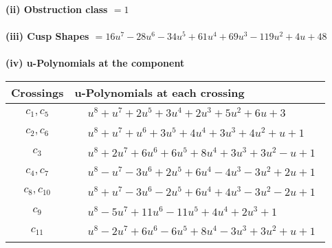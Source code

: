 \documentclass[1p]{elsarticle_modified}
\theoremstyle{definition}
\begin{document}
\flushleft \textbf{(ii) Obstruction class $= 1$}\\~\\
\flushleft \textbf{(iii) Cusp Shapes $= 16 u^7-28 u^6-34 u^5+61 u^4+69 u^3-119 u^2+4 u+48$}\\~\\
\newpage\renewcommand{\arraystretch}{1}
\flushleft \textbf{(iv) u-Polynomials at the component}\newline \\
\begin{tabular}{m{50pt}|m{274pt}}
Crossings & \hspace{64pt}u-Polynomials at each crossing \\
\hline $$\begin{aligned}c_{1},c_{5}\end{aligned}$$&$\begin{aligned}
&u^8+u^7+2 u^5+3 u^4+2 u^3+5 u^2+6 u+3
\end{aligned}$\\
\hline $$\begin{aligned}c_{2},c_{6}\end{aligned}$$&$\begin{aligned}
&u^8+u^7+u^6+3 u^5+4 u^4+3 u^3+4 u^2+u+1
\end{aligned}$\\
\hline $$\begin{aligned}c_{3}\end{aligned}$$&$\begin{aligned}
&u^8+2 u^7+6 u^6+6 u^5+8 u^4+3 u^3+3 u^2- u+1
\end{aligned}$\\
\hline $$\begin{aligned}c_{4},c_{7}\end{aligned}$$&$\begin{aligned}
&u^8- u^7-3 u^6+2 u^5+6 u^4-4 u^3-3 u^2+2 u+1
\end{aligned}$\\
\hline $$\begin{aligned}c_{8},c_{10}\end{aligned}$$&$\begin{aligned}
&u^8+u^7-3 u^6-2 u^5+6 u^4+4 u^3-3 u^2-2 u+1
\end{aligned}$\\
\hline $$\begin{aligned}c_{9}\end{aligned}$$&$\begin{aligned}
&u^8-5 u^7+11 u^6-11 u^5+4 u^4+2 u^3+1
\end{aligned}$\\
\hline $$\begin{aligned}c_{11}\end{aligned}$$&$\begin{aligned}
&u^8-2 u^7+6 u^6-6 u^5+8 u^4-3 u^3+3 u^2+u+1
\end{aligned}$\\
\hline
\end{tabular}\\~\\
\end{document}
